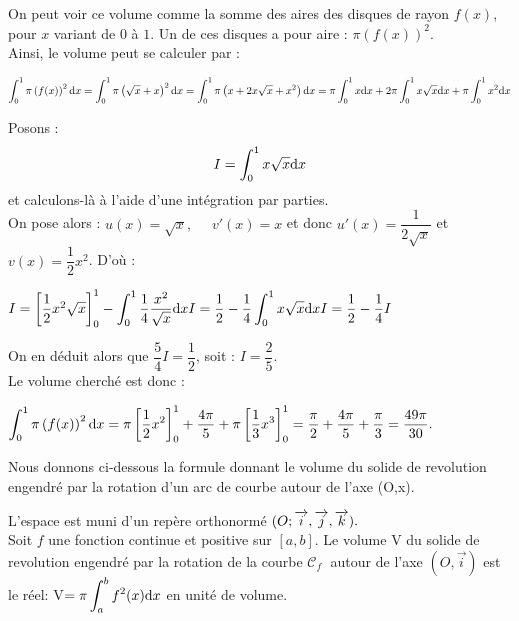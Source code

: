 On peut voir ce volume comme la somme des aires des disques de rayon $f(x)$, pour $x$ variant de $0$ à $1$. Un de ces disques a pour aire : $\pi\left(f(x)\right)^2$.\\
Ainsi, le volume peut se calculer par :

$
\displaystyle\int_{0}^{1}\pi\left(f(x)\right)^2{\rm d}x  = \displaystyle\int_{0}^{1}\pi\left(\sqrt{x}+x\right)^2{\rm d}x\\
 = \displaystyle\int_{0}^{1}\pi\left(x+2x\sqrt{x}+x^2\right){\rm d}x\\
 = \pi \displaystyle\int_{0}^{1} x{\rm d}x + 2\pi\displaystyle\int_{0}^{1}x\sqrt{x}{\rm d}x + \pi\displaystyle\int_{0}^{1}x^2{\rm d}x$


Posons :
\[ I =\displaystyle\int_{0}^{1}x\sqrt{x}{\rm d}x \]
et calculons-là à l'aide d'une intégration par parties.\\
On pose alors : $u(x)=\sqrt{x},\quad $ $v'(x)=x$ et donc $u'(x)=\dfrac{1}{2\sqrt{x}}$ et $v(x)=\dfrac{1}{2}x^2$. D'où :

$I  = \left[\dfrac{1}{2}x^2\sqrt{x}\right]_0^1-\displaystyle\int_{0}^{1}\dfrac{1}{4}\dfrac{x^2}{\sqrt{x}}{\rm d}x\\
I = \dfrac{1}{2}-\dfrac{1}{4}\displaystyle\int_{0}^{1}x\sqrt{x}{\rm d}x\\
I = \dfrac{1}{2}-\dfrac{1}{4}I$


On en déduit alors que $\dfrac{5}{4}I=\dfrac{1}{2}$, soit : $I=\dfrac{2}{5}.$\\
Le volume cherché est donc :

$\displaystyle\int_{0}^{1}\pi\left(f(x)\right)^2{\rm d}x  = \pi\left[\dfrac{1}{2}x^2\right]_0^1+\dfrac{4\pi}{5}+\pi\left[\dfrac{1}{3}x^3\right]_0^1
 = \dfrac{\pi}{2}+\dfrac{4\pi}{5}+\dfrac{\pi}{3}
 = \dfrac{49\pi}{30}.$


Nous donnons  ci-dessous la formule donnant le volume du solide  de revolution engendré par la rotation d'un arc de courbe autour de l'axe (O,x).

\begin{property}
 L'espace est muni d'un repère  orthonormé $ (O ;\overrightarrow{i},\overrightarrow{j}, \overrightarrow{k}). $\\
  Soit $f$ une fonction continue   et positive sur $[a, b]$. Le  volume  V du solide  de revolution engendré par la rotation de la courbe $ \mathcal{C}_{f}\; $    autour de l'axe $(O,\overrightarrow{i} ) $  est  le réel:\; V$ =\pi \displaystyle\int_{a}^{b}f^{2}(x){\rm d}x  $  en unité de volume.
  
 \end{property} 
 
